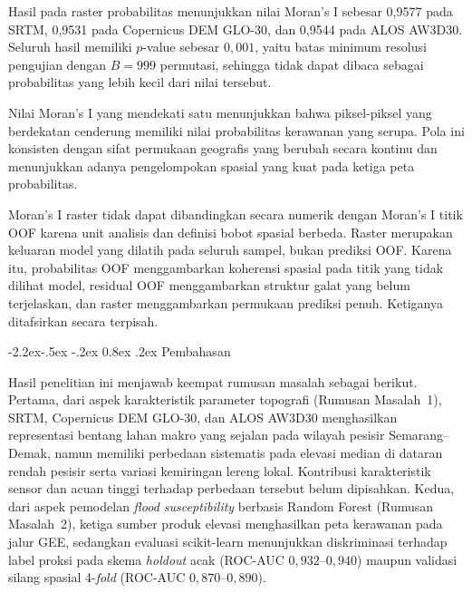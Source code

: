 \documentclass[12pt,a4paper]{article}
\makeatletter
\renewcommand\subsection{\@startsection{subsection}{2}{\z@}%
  {-2.2ex\@plus -.5ex \@minus -.2ex}%
  {0.8ex \@plus .2ex}%
  {\normalfont\normalsize\bfseries}}
\makeatother
\begin{document}
Hasil pada raster probabilitas menunjukkan nilai Moran's I sebesar 0,9577
pada SRTM, 0,9531 pada Copernicus DEM GLO-30, dan 0,9544 pada ALOS AW3D30.
Seluruh hasil memiliki $p$-value sebesar $0{,}001$, yaitu batas minimum
resolusi pengujian dengan $B=999$ permutasi, sehingga tidak dapat dibaca
sebagai probabilitas yang lebih kecil dari nilai tersebut.

Nilai Moran's I yang mendekati satu menunjukkan bahwa piksel-piksel yang
berdekatan cenderung memiliki nilai probabilitas kerawanan yang serupa. Pola
ini konsisten dengan sifat permukaan geografis yang berubah secara kontinu
dan menunjukkan adanya pengelompokan spasial yang kuat pada ketiga peta
probabilitas.

Moran's I raster tidak dapat dibandingkan secara numerik dengan Moran's I
titik OOF karena unit analisis dan definisi bobot spasial berbeda. Raster
merupakan keluaran model yang dilatih pada seluruh sampel, bukan prediksi OOF.
Karena itu, probabilitas OOF menggambarkan koherensi spasial pada titik yang
tidak dilihat model, residual OOF menggambarkan struktur galat yang belum
terjelaskan, dan raster menggambarkan permukaan prediksi penuh. Ketiganya
ditafsirkan secara terpisah.

\subsection{Pembahasan}
\label{ssec:pembahasan}

Hasil penelitian ini menjawab keempat rumusan masalah sebagai berikut.
Pertama, dari
aspek karakteristik parameter topografi (Rumusan Masalah~1), SRTM, Copernicus
DEM GLO-30, dan ALOS AW3D30 menghasilkan representasi bentang lahan makro yang
sejalan pada wilayah pesisir Semarang--Demak, namun memiliki perbedaan
sistematis pada elevasi median di dataran rendah pesisir serta variasi
kemiringan lereng lokal. Kontribusi karakteristik sensor dan acuan tinggi
terhadap perbedaan tersebut belum dipisahkan. Kedua, dari aspek pemodelan \textit{flood
susceptibility} berbasis Random Forest (Rumusan Masalah~2), ketiga sumber
produk elevasi menghasilkan peta kerawanan pada jalur GEE, sedangkan
evaluasi scikit-learn menunjukkan diskriminasi terhadap label proksi
pada skema \textit{holdout} acak
(ROC-AUC $0{,}932$--$0{,}940$) maupun validasi silang spasial 4-\textit{fold}
(ROC-AUC $0{,}870$--$0{,}890$).
\end{document}
